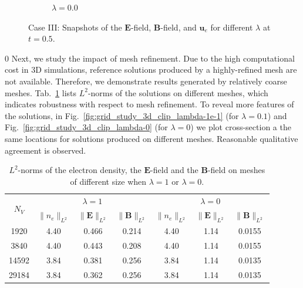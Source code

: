 \documentclass{article}
\def\ifUpdate{1}
\begin{document}
\begin{figure}
\begin{subfigure}[b]{\textwidth}
        \caption{\colorbox{yellow!30}{$\lambda = 0.0$}}
    \end{subfigure}
    \caption{Case III: Snapshots of the $\mathbf{E}$-field, $\mathbf{B}$-field, and $\mathbf{u}_e$ for different $\lambda$ at $t = 0.5$. } 
    \label{fig:3d_vec_field_E_B_ue}
\end{figure}

\if\ifUpdate0
Next, we study the impact of mesh refinement. Due to the high computational cost in 3D
simulations, reference solutions produced by a highly-refined mesh are not
available. Therefore, we demonstrate results generated by relatively coarse
meshes. Tab.~\ref{tab:grid_study_norm} lists $L^2$-norms of the solutions on different
meshes, which indicates robustness with respect to mesh refinement. To reveal more
features of the solutions, in Fig.~\ref{fig:grid_study_3d_clip_lambda-1e-1} (for
$\lambda = 0.1$) and Fig.~\ref{fig:grid_study_3d_clip_lambda-0} (for $\lambda = 0$) we plot
cross-section a the same locations for solutions produced on different meshes. Reasonable
qualitative agreement is observed. 

\begin{table}[]
    \centering
    \begin{tabular}{c | c c c | c c c}
        \hline\hline
        \multirow{2}{1em}{$N_V$} & \multicolumn{3}{c|}{\colorbox{yellow!30}{$\lambda = 1$}}
        &
        \multicolumn{3}{c}{\colorbox{yellow!30}{$\lambda = 0$}} \\
        \cline{2-4} \cline{5-7}
        & $\|n_e \|_{L^2}$ & $\|\mathbf{E} \|_{L^2}$ & $\|\mathbf{B} \|_{L^2}$ & $\|n_e
        \|_{L^2}$
        & $\|\mathbf{E} \|_{L^2}$ & $\|\mathbf{B} \|_{L^2}$  \\
        \hline
         1920  &  4.40 & 0.466 & 0.214 & 4.40 & 1.14 & 0.0155 \\
         3840  &  4.40 & 0.443 & 0.208 & 4.40 & 1.14 & 0.0155 \\
         14592 &  3.84 & 0.381 & 0.256 & 3.84 & 1.14 & 0.0135 \\ 
         29184 &  3.84 & 0.362 & 0.256 & 3.84 & 1.14 & 0.0135 \\
         \hline\hline
    \end{tabular}
    \caption{$L^2$-norms of the electron density, the $\mathbf{E}$-field and the
      $\mathbf{B}$-field on meshes of different size when
      \colorbox{yellow!30}{$\lambda = 1$} or \colorbox{yellow!30}{$\lambda = 0$}.}
    \label{tab:grid_study_norm}
\end{table}
\end{document}
